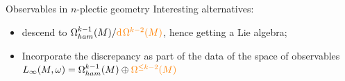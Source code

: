 \documentclass[10pt]{beamer}
\begin{document}
\begin{frame}{Observables in $n$-plectic geometry}
    \vfill
    \pause
    Interesting alternatives:
        \begin{itemize}
          \item  descend to $\Omega^{k-1}_{ham}(M) / {\color{orange}\mathrm{d}\hspace{1pt}\Omega^{k-2}(M)}$, hence getting a Lie algebra;
          \item Incorporate the {\color{orange}discrepancy} as part of the data of the space of observables $
          L_\infty(M,\omega) = \Omega_{ham}^{k-1}(M)\oplus{\color{orange}\Omega^{\leq k-2}(M)}$
        \end{itemize}
    
      \end{frame}
    \note[itemize]{
    \item
    }
    
\end{document}
